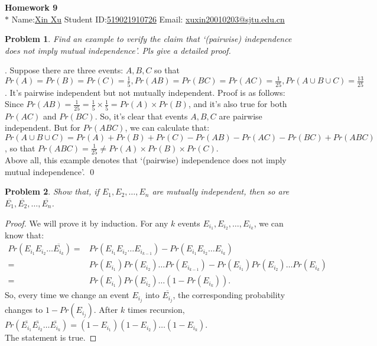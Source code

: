 \documentclass[12pt]{article}
\date{Feb 14, 2012}
\newtheorem{hw}{Problem}
\newenvironment{sol}
  {\par\vspace{3mm}\noindent{\it Solution}.}
  {\qed}
\begin{document}
\begin{center}
{\LARGE\bf Homework 9}\\
\vspace{2mm}
\footnotesize{$*$ Name:\underline{Xin Xu}  \quad Student ID:\underline{519021910726} \quad Email: \underline{xuxin20010203@sjtu.edu.cn}}
\vspace{2mm}
\end{center}

\begin{hw}
Find an example to verify the claim that `(pairwise) independence does not  imply mutual independence'.  Pls give a detailed proof.
\end{hw}

\begin{sol}
    Suppose there are three events: $A,B,C$ so that $Pr(A)=Pr(B)=Pr(C)=\frac{1}{5}, Pr(AB)=Pr(BC)=Pr(AC)=\frac{1}{25}, Pr(A\cup B\cup C)=\frac{13}{25}$.
    It's pairwise independent but not mutually independent. Proof is as follows:\\
    Since $Pr(AB)=\frac{1}{25}=\frac{1}{5}\times \frac{1}{5}=Pr(A)\times Pr(B)$, and it's also true for both $Pr(AC)$ and $Pr(BC)$. So, it's clear that events $A,B,C$ are pairwise independent. But for $Pr(ABC)$, we can calculate that:\\
    $Pr(A\cup B\cup C)=Pr(A)+Pr(B)+Pr(C)-Pr(AB)-Pr(AC)-Pr(BC)+Pr(ABC)$, so that $Pr(ABC)= \frac{1}{25} \neq Pr(A)\times Pr(B)\times Pr(C)$.\\
    Above all, this example denotes that `(pairwise) independence does not imply mutual independence'.
\end{sol}


\begin{hw}
Show that, if $E_1, E_2, \ldots, E_n$ are mutually independent, then so are $\overline{E_1}, \overline{E_2},\ldots, \overline{E_n}$.
\end{hw}

\begin{proof}
    We will prove it by induction.
    For any $k$ events $E_{i_1},E_{i_2},\ldots ,E_{i_k}$, we can know that:
    \begin{align*}
    Pr(E_{i_1}E_{i_2}\ldots \overline{E_{i_k}})= & Pr(E_{i_1}E_{i_2}\ldots E_{i_{k-1}}) - Pr(E_{i_1}E_{i_2}\ldots E_{i_k})\\
    = & Pr(E_{i_1})Pr(E_{i_2})\ldots Pr(E_{i_{k-1}})-Pr(E_{i_1})Pr(E_{i_2})\ldots Pr(E_{i_{k}})\\
    = & Pr(E_{i_1})Pr(E_{i_2})\ldots (1-Pr(E_{i_{k}})).
    \end{align*}
    So, every time we change an event $E_{i_j}$ into $\overline{E_{i_j}}$, the corresponding probability changes to $1-Pr(E_{i_j})$. After $k$ times recursion, $Pr(\overline{E_{i_1}}\overline{E_{i_2}}\ldots \overline{E_{i_k}})=(1-E_{i_1})(1-E_{i_2})\ldots (1-E_{i_k})$.\\
    The statement is true.
\end{proof}
\end{document}
